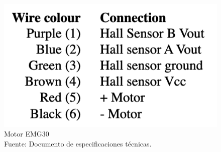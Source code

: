 \begin{figure}[H]
    \centering
    \includegraphics[scale = 0.6]{part/Proyecto_ejecutivo/memoria_constructiva/motor/img/motorConnection}
    \caption{Motor EMG30 \\Fuente: Documento de especificaciones técnicas.\cite{EMG30datasheet}}\label{fig:motor connection}
\end{figure}

